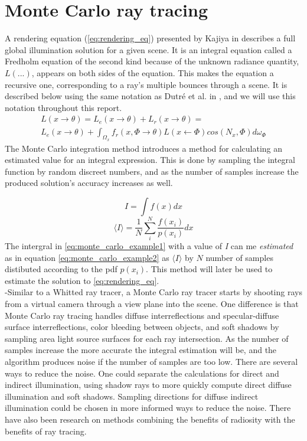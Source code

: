 \documentclass[a4paper, 12pt]{report}
\begin{document}
\section{Monte Carlo ray tracing}
A rendering equation (\ref{eq:rendering_eq}) presented by Kajiya in \cite{kajiya} describes a full global illumination solution for a given scene. It is an integral equation called a Fredholm equation of the second kind because of the unknown radiance quantity, $L(...)$, appears on both sides of the equation. This makes the equation a recursive one, corresponding to a ray's multiple bounces through a scene. It is described below using the same notation as Dutr\'{e} et al. in \cite{dutre}, and we will use this notation throughout this report.
\begin{equation}
\label{eq:rendering_eq}
\begin{split}
L(x \rightarrow \theta) = L_e(x \rightarrow \theta) + L_r(x \rightarrow \theta) =\\ 
L_e(x \rightarrow \theta) + \int_{\Omega_x} f_r(x, \Phi \rightarrow \theta)L(x \leftarrow \Phi)cos(N_x, \Phi)d\omega_{\Phi}
\end{split}
\end{equation}
The Monte Carlo integration method introduces a method for calculating an estimated value for an integral expression. This is done by sampling the integral function by random discreet numbers, and as the number of samples increase the produced solution's accuracy increases as well.

\begin{equation}
 \label{eq:monte_carlo_example1}
 I = \int f(x) dx
 \end{equation}
 \begin{equation}
 \label{eq:monte_carlo_example2}
 \langle I \rangle = \frac{1}{N} \sum^N_i \frac{f(x_i)}{p(x_i)} dx
 \end{equation}
 The intergral in \autoref{eq:monte_carlo_example1} with a value of \emph{I} can me \emph{estimated} as in equation \autoref{eq:monte_carlo_example2} as $\langle I \rangle$ by $N$ number of samples distibuted according to the pdf $p(x_i)$. 
 This method will later be used to estimate the solution to \autoref{eq:rendering_eq}.\\

-Similar to a Whitted ray tracer, a Monte Carlo ray tracer starts by shooting rays from a virtual camera through a view plane into the scene. 
One difference is that Monte Carlo ray tracing handles diffuse interreflections and specular-diffuse surface interreflections, color bleeding between objects, and soft shadows by sampling area light source surfaces for each ray intersection. 
As the number of samples increase the more accurate the integral estimation will be, and the algorithm produces noise if the number of samples are too low. 
There are several ways to reduce the noise. 
One could separate the calculations for direct and indirect illumination, using shadow rays to more quickly compute direct diffuse illumination and soft shadows. 
Sampling directions for diffuse indirect illumination could be chosen in more informed ways to reduce the noise. 
There have also been research on methods combining the benefits of radiosity with the benefits of ray tracing.
\end{document}
